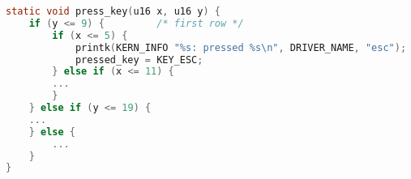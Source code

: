 \begin{lstlisting}[language=c,caption=Функция перевода координат в клавишу,label=lst:press_key]
static void press_key(u16 x, u16 y) {
    if (y <= 9) {         /* first row */
        if (x <= 5) {
            printk(KERN_INFO "%s: pressed %s\n", DRIVER_NAME, "esc");
            pressed_key = KEY_ESC;
        } else if (x <= 11) {
        ...
        }
    } else if (y <= 19) {
    ...
    } else {
        ...
    }
}
\end{lstlisting}
